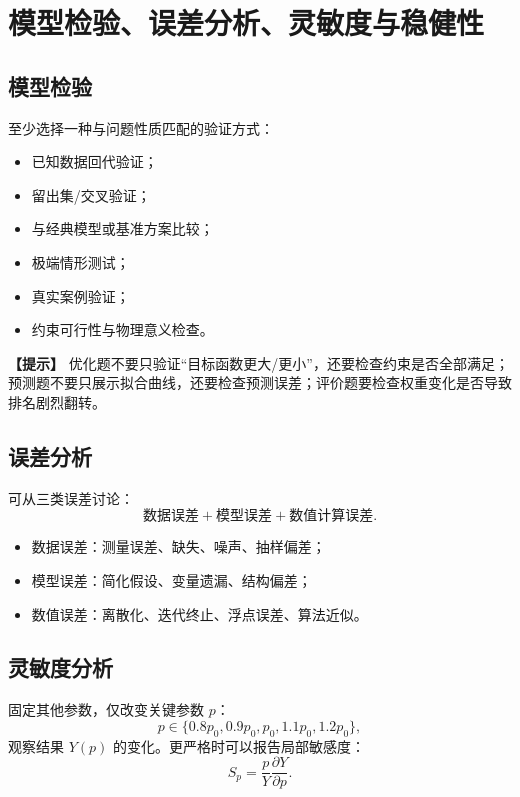 \documentclass[12pt,a4paper]{article}
\newcommand{\tip}[1]{\par\noindent\textbf{【提示】} #1\par}
\begin{document}
\section{模型检验、误差分析、灵敏度与稳健性}

\subsection{模型检验}

至少选择一种与问题性质匹配的验证方式：
\begin{itemize}
  \item 已知数据回代验证；
  \item 留出集/交叉验证；
  \item 与经典模型或基准方案比较；
  \item 极端情形测试；
  \item 真实案例验证；
  \item 约束可行性与物理意义检查。
\end{itemize}

\tip{优化题不要只验证“目标函数更大/更小”，还要检查约束是否全部满足；预测题不要只展示拟合曲线，还要检查预测误差；评价题要检查权重变化是否导致排名剧烈翻转。}

\subsection{误差分析}

可从三类误差讨论：
\[
\text{数据误差}+\text{模型误差}+\text{数值计算误差}.
\]

\begin{itemize}
  \item 数据误差：测量误差、缺失、噪声、抽样偏差；
  \item 模型误差：简化假设、变量遗漏、结构偏差；
  \item 数值误差：离散化、迭代终止、浮点误差、算法近似。
\end{itemize}

\subsection{灵敏度分析}

固定其他参数，仅改变关键参数 $p$：
\[
p\in\{0.8p_0,0.9p_0,p_0,1.1p_0,1.2p_0\},
\]
观察结果 $Y(p)$ 的变化。更严格时可以报告局部敏感度：
\[
S_p=\frac{p}{Y}\frac{\partial Y}{\partial p}.
\]
\end{document}
